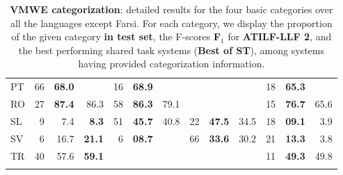 \documentclass[output=paper,modfonts]{langscibook}
\begin{document}
\begin{table}
\begin{tabular}{lrrrrrrrrrrrr}
PT & 66 & \textbf{68.0} &  				& 16 	& \textbf{68.9} &  				&  		&  				&  		& 18 	& \textbf{65.3} &  		\\
RO & 27 & \textbf{87.4} & 86.3 			& 58 	& \textbf{86.3} & 79.1 			&  		&  				&  		& 15 	& \textbf{76.7} & 65.6 	\\
SL & 9 	& 7.4 			& \textbf{8.3} 	& 51 	& \textbf{45.7} & 40.8 			& 22 	& \textbf{47.5} & 34.5  & 18 	& \textbf{09.1} & 3.9 	\\
SV & 6 	& 16.7 			& \textbf{21.1} & 6 	& \textbf{08.7} &  				& 66 	& \textbf{33.6} & 30.2  & 21 	& \textbf{13.3} & 3.8 	\\
TR & 40 & 57.6 			& \textbf{59.1} &  		&  				&  				&  		&  				&  		& 11 	& \textbf{49.3} & 49.8 \\\lspbottomrule
\end{tabular}
\caption{\textbf{VMWE categorization}: detailed results for the four basic categories over all the languages except Farsi. For each category, we display the proportion of the given category \textbf{in test set}, the F-scores \textbf{F$_1$} for \textbf{ATILF-LLF 2}, and the best performing shared task systems (\textbf{Best of ST}), among systems having provided categorization information.}
\label{tab:rescat}
\end{table}


\end{document}
